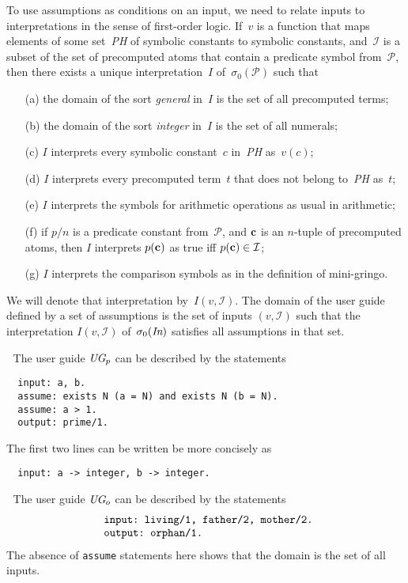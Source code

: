 \documentclass{new_tlp}
\def\beq{\begin{equation}}
\def\eeq#1{\label{#1}\end{equation}}
\def\ba{\begin{array}}
\def\ea{\end{array}}
\def\gringo{{\sc gringo}}
\newcommand{\I}{\mathcal{I}}
\newcommand{\PP}{\mathcal{P}}
\begin{document}
To use assumptions as conditions on an input, we need to relate inputs
to interpretations in the sense of first-order logic.
If~$v$ is a function that maps elements of some set~\emph{PH} of
symbolic constants to symbolic constants, and~$\I$ is a subset of the set of
precomputed atoms that contain a predicate symbol from~$\PP$,
then there exists a unique interpretation~$I$ of~$\sigma_0(\PP)$ such that
\begin{itemize}
\item[(a)]
the domain of the sort \emph{general} in~$I$
  is the set of all precomputed terms;
\item[(b)]
the domain of the sort \emph{integer} in~$I$ is the set of all numerals;
\item[(c)] $I$ interprets every symbolic constant~$c$ in~\emph{PH}
  as~$v(c)$;
\item[(d)] $I$ interprets every precomputed term~$t$ that does not
  belong to~\emph{PH} as~$t$;
\item[(e)] $I$ interprets the symbols for arithmetic operations
  as usual in arithmetic;
\item[(f)] if $p/n$ is a predicate constant from~$\PP$, and $\bf c$
  is an $n$-tuple of precomputed atoms, then $I$ interprets
  $p({\bf c})$ as true iff $p({\bf c})\in\I$;
\item[(g)] $I$ interprets the comparison symbols as in the definition of
  mini-\gringo.
\end{itemize}
We will denote that interpretation by~$I(v,\I)$.
The domain of the user guide defined by a set of assumptions is the set
of inputs $(v,\I)$ such that the interpretation $I(v,\I)$
of~$\sigma_0(\emph{In})$ satisfies all assumptions in that set.

\medskip{}$\;$ The user guide $\emph{UG}_p$
can be described by the statements
\begin{verbatim}
  input: a, b.
  assume: exists N (a = N) and exists N (b = N).
  assume: a > 1.
  output: prime/1.
\end{verbatim}
The first two lines can be written be more concisely as
\begin{verbatim}
  input: a -> integer, b -> integer.
\end{verbatim}

\medskip{}$\;$ The user guide $\emph{UG}_o$
can be described by the statements
\beq\ba l
\verb| input: living/1, father/2, mother/2.|\\
\verb| output: orphan/1.|
\ea\eeq{ugo}
The absence of \verb|assume| statements here shows that the domain
is the set of all inputs.
\end{document}
